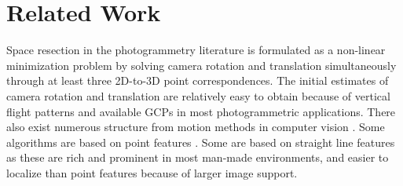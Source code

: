 \section{Related Work}  

Space resection in the photogrammetry literature \cite{DeWitt00, Mikhail01} is formulated as a non-linear minimization problem by solving camera rotation and translation simultaneously through at least three 2D-to-3D point correspondences. The initial estimates of camera rotation and translation are relatively easy to obtain because of vertical flight patterns and available GCPs in most photogrammetric applications. There also exist numerous structure from motion methods in computer vision \cite{Longuet-Higgins87, Weng89, Liu90, Kumar94, Taylor95, Pollefeys04, Snavely2006, Agarwal2009}. Some algorithms are based on point features \cite{Longuet-Higgins87, Weng89, Pollefeys04, Snavely2006, Agarwal2009}. Some are based on straight line features \cite{Liu90, Kumar94, Taylor95} as these are rich and prominent in most man-made environments, and easier to localize than point features because of larger image support. 


